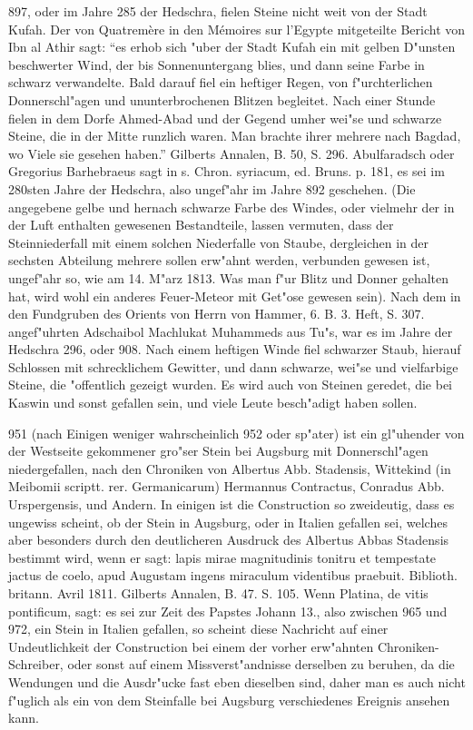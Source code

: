 \documentclass[a4paper, 11pt, oneside, polutonikogreek, german]{article}
\begin{document}
897, oder im Jahre 285 der Hedschra, fielen Steine nicht weit von der Stadt Kufah. Der von Quatremère in den Mémoires sur l'Egypte mitgeteilte Bericht von Ibn al Athir sagt: "`es erhob sich "uber der Stadt Kufah ein mit gelben D"unsten beschwerter Wind, der bis Sonnenuntergang blies, und dann seine Farbe in schwarz verwandelte. Bald darauf fiel ein heftiger Regen, von f"urchterlichen Donnerschl"agen und ununterbrochenen Blitzen begleitet. Nach einer Stunde fielen in dem Dorfe Ahmed-Abad und der Gegend umher wei"se und schwarze Steine, die in der Mitte runzlich waren. Man brachte ihrer mehrere nach Bagdad, wo Viele sie gesehen haben."' Gilberts Annalen, B. 50, S. 296. Abulfaradsch oder Gregorius Barhebraeus sagt in s. Chron. syriacum, ed. Bruns. p. 181, es sei im 280sten Jahre der Hedschra, also ungef"ahr im Jahre 892 geschehen. (Die angegebene gelbe und hernach schwarze Farbe des Windes, oder vielmehr der in der Luft enthalten gewesenen Bestandteile, lassen vermuten, dass der Steinniederfall mit einem solchen Niederfalle von Staube, dergleichen in der sechsten Abteilung mehrere sollen erw"ahnt werden, verbunden gewesen ist, ungef"ahr so, wie am 14. M"arz 1813. Was man f"ur Blitz und Donner gehalten hat, wird wohl ein anderes Feuer-Meteor mit Get"ose gewesen sein). Nach dem in den Fundgruben des Orients von Herrn von Hammer, 6. B. 3. Heft, S. 307. angef"uhrten Adschaibol Machlukat Muhammeds aus Tu"s, war es im Jahre der Hedschra 296, oder 908. Nach einem heftigen Winde fiel schwarzer Staub, hierauf Schlossen mit schrecklichem Gewitter, und dann schwarze, wei"se und vielfarbige Steine, die "offentlich gezeigt wurden. Es wird auch von Steinen geredet, die bei Kaswin und sonst gefallen sein, und viele Leute besch"adigt haben sollen.

951 (nach Einigen weniger wahrscheinlich 952 oder sp"ater) ist ein gl"uhender von der Westseite gekommener gro"ser Stein bei Augsburg mit Donnerschl"agen niedergefallen, nach den Chroniken von Albertus Abb. Stadensis, Wittekind (in Meibomii scriptt. rer. Germanicarum) Hermannus Contractus, Conradus Abb. Urspergensis, und Andern. In einigen ist die Construction so zweideutig, dass es ungewiss scheint, ob der Stein in Augsburg, oder in Italien gefallen sei, welches aber besonders durch den deutlicheren Ausdruck des Albertus Abbas Stadensis bestimmt wird, wenn er sagt: lapis mirae magnitudinis tonitru et tempestate jactus de coelo, apud Augustam ingens miraculum videntibus praebuit. Biblioth. britann. Avril 1811. Gilberts Annalen, B. 47. S. 105. Wenn Platina, de vitis pontificum, sagt: es sei zur Zeit des Papstes Johann 13., also zwischen 965 und 972, ein Stein in Italien gefallen, so scheint diese Nachricht auf einer Undeutlichkeit der Construction bei einem der vorher erw"ahnten Chroniken-Schreiber, oder sonst auf einem Missverst"andnisse derselben zu beruhen, da die Wendungen und die Ausdr"ucke fast eben dieselben sind, daher man es auch nicht f"uglich als ein von dem Steinfalle bei Augsburg verschiedenes Ereignis ansehen kann.
\end{document}

